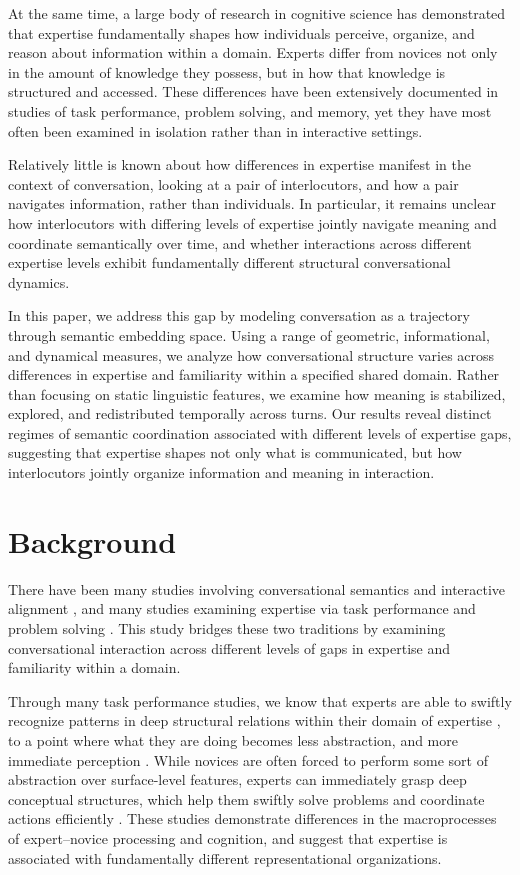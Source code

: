 \documentclass{article}
\theoremstyle{definition}
\numberwithin{table}{section}
\begin{document}
At the same time, a large body of research in cognitive science has demonstrated that expertise fundamentally shapes how individuals perceive, organize, and reason about information within a domain. Experts differ from novices not only in the amount of knowledge they possess, but in how that knowledge is structured and accessed. These differences have been extensively documented in studies of task performance, problem solving, and memory, yet they have most often been examined in isolation rather than in interactive settings.

Relatively little is known about how differences in expertise manifest in the context of conversation, looking at a pair of interlocutors, and how a pair navigates information, rather than individuals. In particular, it remains unclear how interlocutors with differing levels of expertise jointly navigate meaning and coordinate semantically over time, and whether interactions across different expertise levels exhibit fundamentally different structural conversational dynamics.

In this paper, we address this gap by modeling conversation as a trajectory through semantic embedding space. Using a range of geometric, informational, and dynamical measures, we analyze how conversational structure varies across differences in expertise and familiarity within a specified shared domain. Rather than focusing on static linguistic features, we examine how meaning is stabilized, explored, and redistributed temporally across turns. Our results reveal distinct regimes of semantic coordination associated with different levels of expertise gaps, suggesting that expertise shapes not only what is communicated, but how interlocutors jointly organize information and meaning in interaction.

\section{Background}

There have been many studies involving conversational semantics and interactive alignment \citep{pickering_toward_2004,garrod_joint_2009}, and many studies examining expertise via task performance and problem solving \citep{groot_thought_1965,robinson_mathematical_1978}. This study bridges these two traditions by examining conversational interaction across different levels of gaps in expertise and familiarity within a domain.

Through many task performance studies, we know that experts are able to swiftly recognize patterns in deep structural relations within their domain of expertise \citep{egan_chunking_1979}, to a point where what they are doing becomes less abstraction, and more immediate perception \citep{groot_thought_1965}. While novices are often forced to perform some sort of abstraction over surface-level features, experts can immediately grasp deep conceptual structures, which help them swiftly solve problems and coordinate actions efficiently \citep{chi1981expertise}. These studies demonstrate differences in the macroprocesses of expert–novice processing and cognition, and suggest that expertise is associated with fundamentally different representational organizations.
\end{document}

